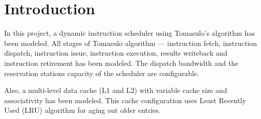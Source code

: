 \section{Introduction}
In this project, a dynamic instruction scheduler using Tomasulo's algorithm has been modeled. All stages of Tomasulo algorithm --- instruction fetch, instruction dispatch, instruction issue, instruction execution, results writeback and instruction retirement has been modeled. The dispatch bandwidth and the reservation stations capacity of the scheduler are configurable. 

Also, a multi-level data cache (L1 and L2) with variable cache size and associativity has been modeled.  This cache configuration uses Least Recently Used (LRU) algorithm for aging out older entries.